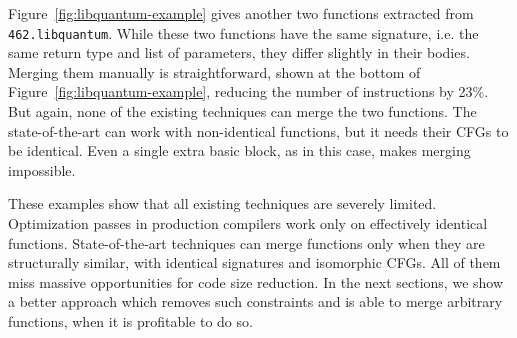 Figure~\ref{fig:libquantum-example} gives another two functions extracted from \texttt{462.libquantum}. While these two functions have the
same signature, i.e. the same return type and list of parameters, they differ slightly in their bodies. Merging them manually
is straightforward, shown at the bottom of Figure~\ref{fig:libquantum-example}, reducing the number of instructions by 23\%. But again,
none of the existing techniques can merge the two functions. The state-of-the-art can work with non-identical functions, but it needs
their CFGs to be identical. Even a single extra basic block, as in this case, makes merging impossible.

These examples show that all existing techniques are severely limited. Optimization passes in production compilers work only on effectively
identical functions. State-of-the-art techniques can merge functions only when they are structurally similar, with identical signatures and
isomorphic CFGs. All of them miss massive opportunities for code size reduction. In the next sections, we show a better approach which
removes such constraints and is able to merge arbitrary functions, when it is profitable to do so.
